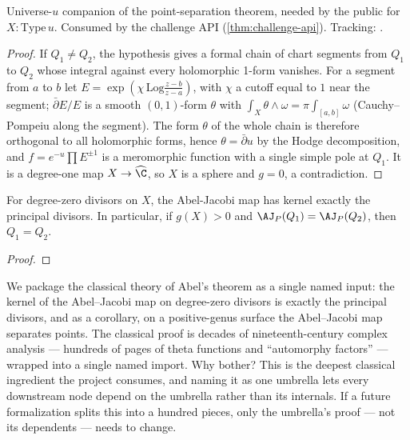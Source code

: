 \begin{lemma}
\label{lem:path-integral-functional-separates-points-u}
Universe-\(u\) companion of the point-separation theorem, needed by the public
 for \(X:\mathrm{Type}\,u\). Consumed by the challenge API
(\ref{thm:challenge-api}).
Tracking: .
\leanok
\end{lemma}
\begin{proof}
\leanok
If \(Q_1\ne Q_2\), the hypothesis gives a formal chain of chart segments from \(Q_1\) to
\(Q_2\) whose integral against every holomorphic 1-form vanishes. For a segment from \(a\)
to \(b\) let \(E=\exp(\chi\,\mathrm{Log}\tfrac{z-b}{z-a})\), with \(\chi\) a cutoff equal
to \(1\) near the segment; \(\bar\partial E/E\) is a smooth \((0,1)\)-form \(\theta\) with
\(\int_X\theta\wedge\omega=\pi\int_{[a,b]}\omega\) (Cauchy--Pompeiu along the segment). The
form \(\theta\) of the whole chain is therefore orthogonal to all holomorphic forms, hence
\(\theta=\bar\partial u\) by the Hodge decomposition, and \(f=e^{-u}\prod E^{\pm1}\) is a
meromorphic function with a single simple pole at \(Q_1\). It is a degree-one map
\(X\to\widehat{\C}\), so \(X\) is a sphere and \(g=0\), a contradiction.
\end{proof}

\begin{theorem}
\label{input:abel-theorem}
\leanok
For degree-zero divisors on \(X\), the Abel-Jacobi map has kernel exactly the
principal divisors. In particular, if \(g(X)>0\) and
\(\AJ_P(Q_1)=\AJ_P(Q_2)\), then \(Q_1=Q_2\).
\end{theorem}
\begin{proof}\leanok\end{proof}

\begin{layman}
We package the classical theory of Abel's theorem as a single named
input: the kernel of the Abel--Jacobi map on degree-zero divisors is
exactly the principal divisors, and as a corollary, on a positive-genus
surface the Abel--Jacobi map separates points. The classical proof is
decades of nineteenth-century complex analysis --- hundreds of pages of
theta functions and ``automorphy factors'' --- wrapped into a single
named import. Why bother? This is the deepest classical ingredient the
project consumes, and naming it as one umbrella lets every downstream
node depend on the umbrella rather than its internals. If a future
formalization splits this into a hundred pieces, only the umbrella's
proof --- not its dependents --- needs to change.
\end{layman}

